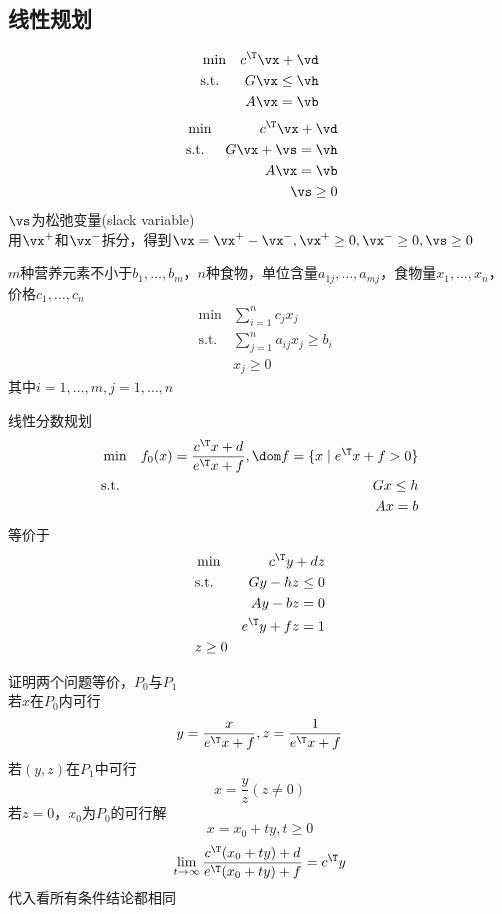 \subsection{线性规划}
\[\begin{aligned}
&\min &c^\T\vx+\vd\\
&\text{s.t.} & G\vx\leq\vh\\
& & A\vx=\vb
\end{aligned}\]
\[\begin{aligned}
&\min &c^\T\vx+\vd\\
&\text{s.t.} & G\vx+\vs=\vh\\\
& & A\vx=\vb\\
& & \vs\geq 0
\end{aligned}\]
$\vs$为松弛变量(slack variable)\\
用$\vx^+$和$\vx^-$拆分，得到$\vx=\vx^+-\vx^-,\vx^+\geq 0,\vx^-\geq 0,\vs\geq 0$

\begin{example}[食谱问题]
$m$种营养元素不小于$b_1,\ldots,b_m$，$n$种食物，单位含量$a_{1j},\ldots,a_{mj}$，食物量$x_1,\ldots,x_n$，价格$c_1,\ldots,c_n$
\[\begin{aligned}
& \min & \sum_{i=1}^n c_jx_j\\
& \text{s.t.} & \sum_{j=1}^n a_{ij}x_j\geq b_i\\
& & x_j\geq 0
\end{aligned}\]
其中$i=1,\ldots,m,j=1,\ldots,n$
\end{example}

线性分数规划
\[\begin{aligned}
& \min & f_0(x)=\frac{c^\T x+d}{e^\T x+f}, \dom f=\{x \mid e^\T x + f >0 \}\\
& \text{s.t.} & Gx\leq h\\
& & Ax=b
\end{aligned}\]
等价于
\[\begin{aligned}
	& \min & c^\T y+dz\\
	& \text{s.t.} & Gy-hz\leq 0\\
	& & Ay-bz= 0\\
	& & e^\T y+fz=1\\
	& z\geq 0
\end{aligned}\]
\begin{analysis}
	证明两个问题等价，$P_0$与$P_1$\\
	若$x$在$P_0$内可行
	\[y=\frac{x}{e^\T x+f},z=\frac{1}{e^\T x+f}\]
	若$(y,z)$在$P_1$中可行
	\[x=\frac{y}{z}(z\ne 0)\]
	若$z=0$，$x_0$为$P_0$的可行解
	\[x=x_0+ty,t\geq 0\]
	\[\lim_{t\to\infty}\frac{c^\T(x_0+ty)+d}{e^\T(x_0+ty)+f}=c^\T y\]%
	代入看所有条件结论都相同
\end{analysis}

